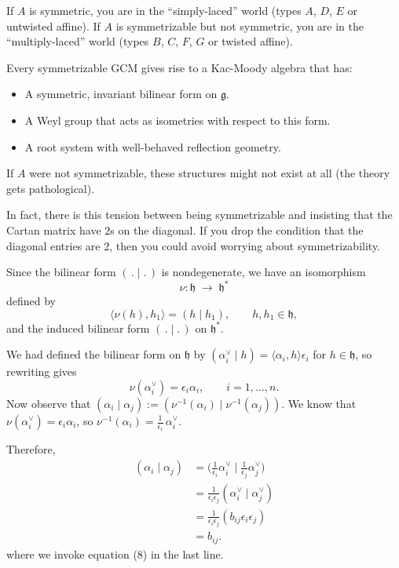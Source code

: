 \documentclass[12pt]{article}
\begin{document}
\begin{remark}
    If $A$ is symmetric, you are in the “simply-laced” world (types $A$, $D$, $E$ or untwisted affine). If $A$ is symmetrizable but not symmetric, you are in the “multiply-laced” world (types $B$, $C$, $F$, $G$ or twisted affine).

    Every symmetrizable GCM gives rise to a Kac-Moody algebra that has:
    \begin{itemize}
        \item A symmetric, invariant bilinear form on $\mathfrak{g}$.
        \item A Weyl group that acts as isometries with respect to this form.
        \item A root system with well-behaved reflection geometry.
    \end{itemize}

    If $A$ were not symmetrizable, these structures might not exist at all (the theory gets pathological).

    In fact, there is this tension between being symmetrizable and insisting that the Cartan matrix have $2$s on the diagonal. If you drop the condition that the diagonal entries are $2$, then you could avoid worrying about symmetrizability.
\end{remark}

Since the bilinear form $(\,.\mid.\,)$ is nondegenerate, we have an isomorphism
\[
    \nu : \mathfrak{h} \;\to\; \mathfrak{h}^*
\]
defined by
\[
    \langle \nu(h), h_1 \rangle = (h \mid h_1),
    \qquad h,h_1 \in \mathfrak{h},
\]
and the induced bilinear form $(\,.\mid.\,)$ on $\mathfrak{h}^*$.

We had defined the bilinear form on $\mathfrak{h}$ by
$(\alpha_i^\vee \mid h) = \langle \alpha_i, h \rangle \epsilon_i$ for $h \in \mathfrak{h}$, so rewriting gives
\begin{equation}
    \nu(\alpha_i^\vee) = \epsilon_i \alpha_i,
    \qquad i=1,\ldots,n.
\end{equation}
Now observe that
$(\alpha_i \mid \alpha_j) := (\nu^{-1}(\alpha_i) \mid \nu^{-1}(\alpha_j))$. We know that $\nu(\alpha_i^\vee) = \epsilon_i \alpha_i$, so $\nu^{-1}(\alpha_i) = \tfrac{1}{\epsilon_i}\,\alpha_i^\vee$.

Therefore, \begin{align*}
    (\alpha_i \mid \alpha_j) & = \Big(\tfrac{1}{\epsilon_i}\alpha_i^\vee \;\Big|\; \tfrac{1}{\epsilon_j}\alpha_j^\vee \Big) \\
                             & = \frac{1}{\epsilon_i \epsilon_j} (\alpha_i^\vee \mid \alpha_j^\vee)                         \\
                             & = \frac{1}{\epsilon_i \epsilon_j} (b_{ij} \epsilon_i \epsilon_j)                             \\
                             & = b_{ij}.
\end{align*}
where we invoke equation (8) in the last line.
\end{document}
